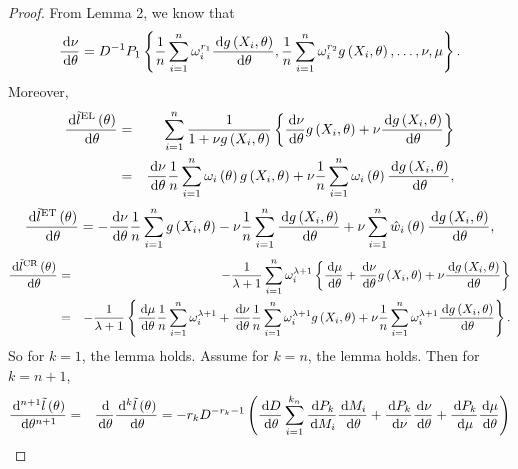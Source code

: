 \begin{proof}
From Lemma 2, we know that 
\[
\frac{\,\mathrm{d}\nu}{\,\mathrm{d}\theta}=D^{-1}P_{1}\left\{ \frac{1}{n}\sum_{i=1}^{n}\omega_{i}^{r_{1}}\frac{\,\mathrm{d} g\left(X_{i},\theta\right)}{\,\mathrm{d}\theta},\frac{1}{n}\sum_{i=1}^{n}\omega_{i}^{r_{2}}g\left(X_{i},\theta\right),\ldots,\nu,\mu\right\} .
\]
Moreover, 
\begin{eqnarray*}
\frac{\,\mathrm{d}\tilde{l}^{\mathrm{EL}}\left(\theta\right)}{\,\mathrm{d}\theta} & = & \sum_{i=1}^{n}\frac{1}{1+\nu g\left(X_{i},\theta\right)}\left\{ \frac{\,\mathrm{d}\nu}{\,\mathrm{d}\theta}g\left(X_{i},\theta\right)+\nu\frac{\,\mathrm{d} g\left(X_{i},\theta\right)}{\,\mathrm{d}\theta}\right\} \\
 & = & \frac{\,\mathrm{d}\nu}{\,\mathrm{d}\theta}\frac{1}{n}\sum_{i=1}^{n}\omega_{i}\left(\theta\right)g\left(X_{i},\theta\right)+\nu\frac{1}{n}\sum_{i=1}^{n}\omega_{i}\left(\theta\right)\frac{\,\mathrm{d} g\left(X_{i},\theta\right)}{\,\mathrm{d}\theta},
\end{eqnarray*}
\[
\frac{\,\mathrm{d}\tilde{l}^{\mathrm{ET}}\left(\theta\right)}{\,\mathrm{d}\theta}=-\frac{\,\mathrm{d}\nu}{\,\mathrm{d}\theta}\frac{1}{n}\sum_{i=1}^{n}g\left(X_{i},\theta\right)-\nu\frac{1}{n}\sum_{i=1}^{n}\frac{\,\mathrm{d} g\left(X_{i},\theta\right)}{\,\mathrm{d}\theta}+\nu\sum_{i=1}^{n}\hat{w}_{i}\left(\theta\right)\frac{\,\mathrm{d} g\left(X_{i},\theta\right)}{\,\mathrm{d}\theta},
\]
\begin{eqnarray*}
\frac{\,\mathrm{d}\tilde{l}^{\mathrm{CR}}\left(\theta\right)}{\,\mathrm{d}\theta} & = & -\frac{1}{\lambda+1}\sum_{i=1}^{n}\omega_{i}^{\lambda+1}\left\{ \frac{\,\mathrm{d}\mu}{\,\mathrm{d}\theta}+\frac{\,\mathrm{d}\nu}{\,\mathrm{d}\theta}g\left(X_{i},\theta\right)+\nu\frac{\,\mathrm{d} g\left(X_{i},\theta\right)}{\,\mathrm{d}\theta}\right\} \\
 & = & -\frac{1}{\lambda+1}\left\{ \frac{\,\mathrm{d}\mu}{\,\mathrm{d}\theta}\frac{1}{n}\sum_{i=1}^{n}\omega_{i}^{\lambda+1}+\frac{\,\mathrm{d}\nu}{\,\mathrm{d}\theta}\frac{1}{n}\sum_{i=1}^{n}\omega_{i}^{\lambda+1}g\left(X_{i},\theta\right)+\nu\frac{1}{n}\sum_{i=1}^{n}\omega_{i}^{\lambda+1}\frac{\,\mathrm{d} g\left(X_{i},\theta\right)}{\,\mathrm{d}\theta}\right\} .
\end{eqnarray*}
So for $k=1$, the lemma holds. Assume for $k=n$, the lemma holds. Then 
for $k=n+1$, 
\begin{eqnarray*}
\frac{\diff^{n+1}\tilde{l}\left(\theta\right)}{\diff\theta^{n+1}} & = & \frac{\diff}{\diff\theta_{}}\frac{\diff^{k}\tilde{l}\left(\theta\right)}{\diff\theta}=-r_{k}D^{-r_{k}-1}\left(\frac{\diff D}{\diff\theta}\sum_{i=1}^{k_{n}}\frac{\diff P_{k}}{\diff M_{i}}\frac{\diff M_{i}}{\diff\theta}+\frac{\diff P_{k}}{\diff\nu}\frac{\diff\nu}{\diff\theta}+\frac{\diff P_{k}}{\diff\mu}\frac{\diff\mu}{\diff\theta}\right)

\end{eqnarray*}
\end{proof}

